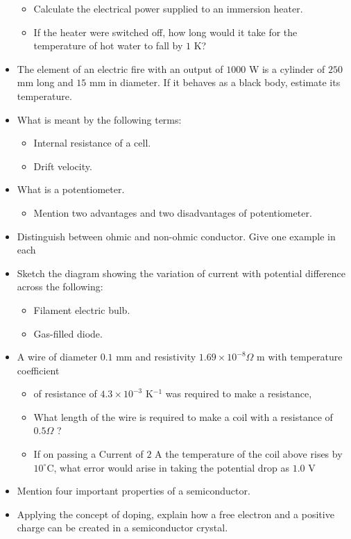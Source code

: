 \documentclass{article}
\begin{document}
\begin{itemize}
 \begin{itemize}
\item Calculate the electrical power supplied to an immersion heater.
\item If the heater were switched off, how long would it take for the temperature of hot water to fall by $ 1$ K?
\end{itemize}
\item The element of an electric fire with an output of $ 1000$ W is a cylinder of $ 250$ mm long and $ 15$ mm in diameter. If it behaves as a black body, estimate its temperature.
\item What is meant by the following terms:
 \begin{itemize}
\item  Internal resistance of a cell. 
\item  Drift velocity. 
\end{itemize}
\item What is a potentiometer. 
 \begin{itemize}
\item Mention two advantages and two disadvantages of potentiometer.
\end{itemize}
\item Distinguish between ohmic and non-ohmic conductor. Give one example in each
\item Sketch the diagram showing the variation of current with potential difference across the following:
 \begin{itemize}
\item  Filament electric bulb. 
\item Gas-filled diode. 
\end{itemize}
\item A wire of diameter $ 0.1$ mm and resistivity $ 1.69\times10^{-8}\Omega$ m with temperature coefficient
 \begin{itemize}
\item of resistance of $ 4.3\times10^{-3}$ K$ ^{-1}$ was required to make a resistance,
\item  What length of the wire is required to make a coil with a resistance of $ 0.5\Omega $ ?
\item If on passing a Current of $ 2$ A the temperature of the coil above rises  by $ 10^{\circ}$C, what error would arise in taking the potential drop as $ 1.0$ V 
\end{itemize}
\item Mention four important properties of a semiconductor.
\item Applying the concept of doping, explain how a free electron and a positive charge can be created in a semiconductor crystal. 

\end{itemize}
\end{document}
